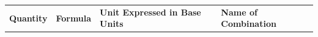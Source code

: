{{    \addtocounter{footnote}{-0}
    
          }{ %
        
    
        \begin{center}
      
      \label{m30853*uid15}
      
    \noindent
      \tablelasttail{}
      \begin{xtabular}[t]{|l|l|l|l|}\hline
    
    
        
                \textbf{Quantity}
               &
    
    
        
                \textbf{Formula}
               &
    
    
        
                \textbf{Unit Expressed in Base Units}
               &
    
    
        
                \textbf{Name of Combination}
     \tabularnewline{}
    
    

\end{xtabular}
\end{center}}}
